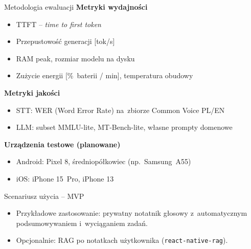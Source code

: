 \documentclass[aspectratio=169,11pt]{beamer}
\begin{document}
\begin{frame}{Metodologia ewaluacji}
  \textbf{Metryki wydajności}
  \begin{itemize}
    \item TTFT -- \emph{time to first token}
    \item Przepustowość generacji [tok/s]
    \item RAM peak, rozmiar modelu na dysku
    \item Zużycie energii [\%~baterii / min], temperatura obudowy
  \end{itemize}
  \textbf{Metryki jakości}
  \begin{itemize}
    \item STT: WER (Word Error Rate) na~zbiorze Common Voice PL/EN
    \item LLM: subset MMLU-lite, MT-Bench-lite, własne prompty domenowe
  \end{itemize}
  \textbf{Urządzenia testowe (planowane)}
  \begin{itemize}
    \item Android: Pixel 8, średniopółkowiec (np.~Samsung~A55)
    \item iOS: iPhone 15~Pro, iPhone 13
  \end{itemize}
\end{frame}

\begin{frame}{Scenariusz użycia -- MVP}
  \centering
  \vspace{1.5em}
  \begin{itemize}
    \item Przykładowe zastosowanie: prywatny notatnik głosowy z~automatycznym podsumowywaniem i~wyciąganiem zadań.
    \item Opcjonalnie: RAG po notatkach użytkownika (\texttt{react-native-rag}).
  \end{itemize}
\end{frame}
\end{document}
